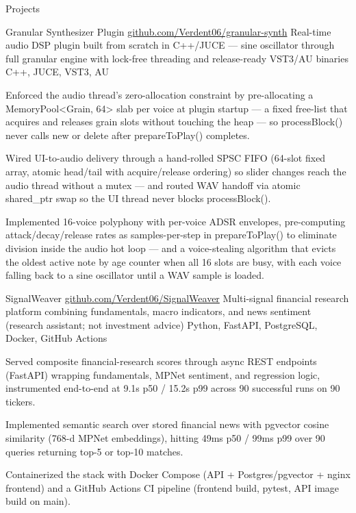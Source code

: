 \documentclass[
	11pt
]{../../../template}
\begin{document}
	\begin{rSection}{P}{rojects}
		\begin{rSectionEntry}
			{Granular Synthesizer Plugin}
			{\href{https://github.com/Verdent06/granular-synth}{github.com/Verdent06/granular-synth}}
			{Real-time audio DSP plugin built from scratch in C++/JUCE --- sine oscillator through full granular engine with lock-free threading and release-ready VST3/AU binaries}
			{C++, JUCE, VST3, AU}
			{}

			\item Enforced the audio thread's zero-allocation constraint by pre-allocating a MemoryPool<Grain, 64> slab per voice at plugin startup --- a fixed free-list that acquires and releases grain slots without touching the heap --- so processBlock() never calls new or delete after prepareToPlay() completes.
			\item Wired UI-to-audio delivery through a hand-rolled SPSC FIFO (64-slot fixed array, atomic head/tail with acquire/release ordering) so slider changes reach the audio thread without a mutex --- and routed WAV handoff via atomic shared\_ptr swap so the UI thread never blocks processBlock().
			\item Implemented 16-voice polyphony with per-voice ADSR envelopes, pre-computing attack/decay/release rates as samples-per-step in prepareToPlay() to eliminate division inside the audio hot loop --- and a voice-stealing algorithm that evicts the oldest active note by age counter when all 16 slots are busy, with each voice falling back to a sine oscillator until a WAV sample is loaded.
		\end{rSectionEntry}

		\begin{rSectionEntry}
			{SignalWeaver}
			{\href{https://github.com/Verdent06/SignalWeaver}{github.com/Verdent06/SignalWeaver}}
			{Multi-signal financial research platform combining fundamentals, macro indicators, and news sentiment (research assistant; not investment advice)}
			{Python, FastAPI, PostgreSQL, Docker, GitHub Actions}
			{}

			\item Served composite financial-research scores through async REST endpoints (FastAPI) wrapping fundamentals, MPNet sentiment, and regression logic, instrumented end-to-end at 9.1s p50 / 15.2s p99 across 90 successful runs on 90 tickers.
			\item Implemented semantic search over stored financial news with pgvector cosine similarity (768-d MPNet embeddings), hitting 49ms p50 / 99ms p99 over 90 queries returning top-5 or top-10 matches.
			\item Containerized the stack with Docker Compose (API + Postgres/pgvector + nginx frontend) and a GitHub Actions CI pipeline (frontend build, pytest, API image build on main).
		\end{rSectionEntry}
	\end{rSection}
\end{document}
